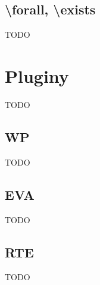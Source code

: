 \subsection{\textbackslash forall, \textbackslash exists}

TODO

\section{Pluginy} \label{chapter:pluginy}

TODO

\subsection{WP}

TODO

\subsection{EVA}

TODO

\subsection{RTE}

TODO
